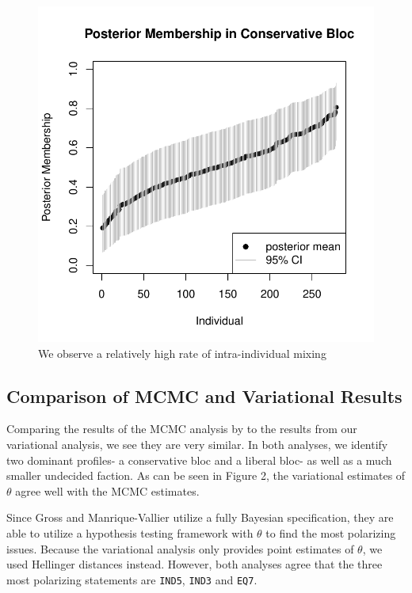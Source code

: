 \documentclass{article}\usepackage[]{graphicx}\usepackage[]{color}
\makeatletter
\def\maxwidth{ %
  \ifdim\Gin@nat@width>\linewidth
    \linewidth
  \else
    \Gin@nat@width
  \fi
}
\newenvironment{knitrout}{}{} %
\renewenvironment{knitrout}{\begin{singlespace}}{\end{singlespace}}
\makeatother
\begin{document}
\begin{knitrout}
\begin{figure}
{\centering \includegraphics[width=\maxwidth]{figure/posteriorMem-1} 

}

\caption[We observe a relatively high rate of intra-individual mixing]{We observe a relatively high rate of intra-individual mixing}\label{fig:posteriorMem}
\end{figure}


\end{knitrout}


\subsection{Comparison of MCMC and Variational Results}
Comparing the results of the MCMC analysis by \cite{grossManriqueVallier} to the results from our variational analysis, we see they are very similar. In both analyses, we identify two dominant profiles- a conservative bloc and a liberal bloc- as well as a much smaller undecided faction. As can be seen in Figure 2, the variational estimates of $\theta$ agree well with the MCMC estimates.

Since Gross and Manrique-Vallier utilize a fully Bayesian specification, they  are able to utilize a hypothesis testing framework with $\theta$ to find the most polarizing issues. Because the variational analysis only provides point estimates of $\theta$, we used Hellinger distances instead. However, both analyses agree that the three most polarizing statements are  \texttt{IND5}, \texttt{IND3} and \texttt{EQ7}.
\end{document}
